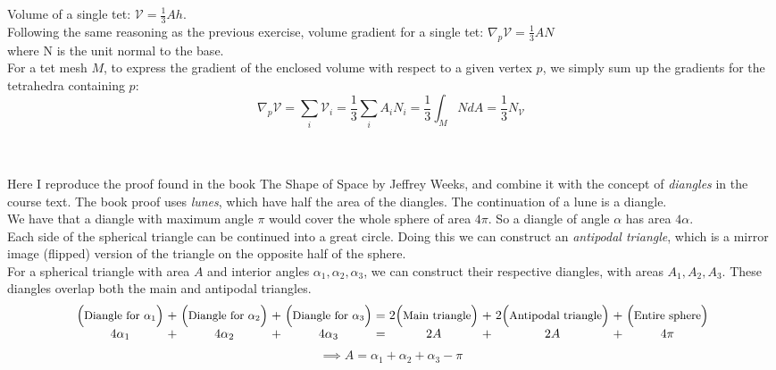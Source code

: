 \documentclass{article}
\newcommand\ifrac[2]{{\displaystyle\frac{#1}{#2}}}
\def\grad{\nabla}
\def\cV{\mathcal{V}}
\begin{document}
Volume of a single tet: $\cV = \ifrac13 A h$.\\
Following the same reasoning as the previous exercise, volume gradient for a single tet: $\grad_p \cV =  \ifrac13 A N$\\
where N is the unit normal to the base.\\
For a tet mesh $M$, to express the gradient of the enclosed volume with respect to a given vertex $p$,
we simply sum up the gradients for the tetrahedra containing $p$:
$$
    \grad_p \cV = \sum_i \cV_i = \frac13 \sum_i A_i N_i = \frac13 \int_M NdA = \frac13 N_{\cV}
$$


\pagebreak
{}\\\\


Here I reproduce the proof found in the book The Shape of Space by Jeffrey Weeks, and combine it with the concept of \emph{diangles} in the course text.
The book proof uses \emph{lunes}, which have half the area of the diangles. The continuation of a lune is a diangle.\\

We have that a diangle with maximum angle $\pi$ would cover the whole sphere of area $4\pi$.
So a diangle of angle $\alpha$ has area $4\alpha$.\\

Each side of the spherical triangle can be continued into a great circle. Doing this we can construct an \emph{antipodal triangle}, which 
is a mirror image (flipped) version of the triangle on the opposite half of the sphere.\\

For a spherical triangle with area $A$ and interior angles $\alpha_1, \alpha_2, \alpha_3$, we can construct their respective diangles,
with areas $A_1, A_2, A_3$. These diangles overlap both the main and antipodal triangles.\\

\begin{equation*}
    \setlength\arraycolsep{1.5pt}
    \begin{array}{rccccccccccc}
        &\Bigl(\text{\small{Diangle for} $\alpha_1$}\Bigr) &+ &\Bigl(\text{\small{Diangle for} $\alpha_2$}\Bigr) &+ &\Bigl(\text{\small{Diangle for} $\alpha_3$}\Bigr)
        &= &2\Bigl(\text{\small{Main triangle}}\Bigr) &+ &2\Bigl(\text{\small{Antipodal triangle}}\Bigr) &+ &\Bigl(\text{\small{Entire sphere}}\Bigr)\\
        &4\alpha_1 &+ &4\alpha_2 &+ &4\alpha_3 &= &2A &+ &2A &+ &4\pi
    \end{array}
\end{equation*}
$$\implies A = \alpha_1 + \alpha_2 + \alpha_3 - \pi$$
\end{document}
